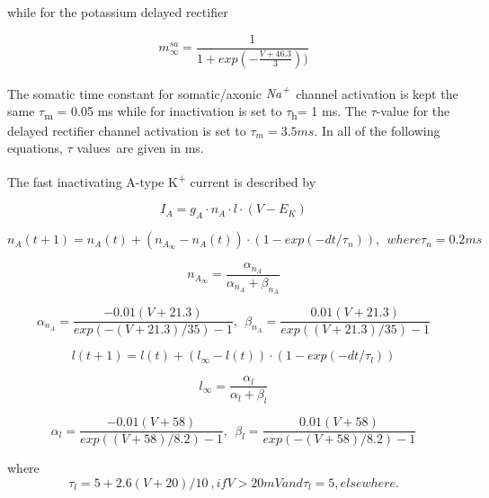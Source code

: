 \documentclass[12pt]{article}
\begin{document}
while for the potassium delayed rectifier

\begin{equation}
m_{\infty}^{sa}=\frac {1}{1+exp(-\frac{V+46.3}{3}))}
\end{equation}

The somatic time constant for somatic/axonic \textit{Na}\textit{\textsuperscript{+}}~channel activation is kept the
same $\tau$\textsubscript{m} = 0.05 ms while for inactivation is set to $\tau$\textsubscript{h}= 1 ms. The $\tau$-value for the delayed rectifier channel activation is set to $\tau_{m}= 3.5 ms$. In all of the
following equations, $\tau$ values~are given in ms.



The fast inactivating A-type K\textsuperscript{+ }current is described by


\begin{equation}
I_A = g_A \cdot n_A \cdot l \cdot (V-E_K)
\end{equation}

\begin{equation}
n_A(t+1)=n_A(t)+(n_{A_{\infty }}-n_A(t))\cdot (1-exp(-dt/\tau_n)),\ \ where 
\tau_n=0.2 ms
\end{equation}

\begin{equation}
n_{A_{\infty }}=\frac{\alpha_{n_A}}{\alpha_{n_A}+\beta_{n_A}}
\end{equation}

\begin{equation}
\alpha_{n_A}=\frac{-0.01(V+21.3)}{exp(-(V+21.3)/35)-1} ,\ \  \beta_{n_A}=\frac{0.01(V+21.3)}{exp( (V+21.3)/35)-1}
\end{equation}

\begin{equation}
l(t+1)=l(t)+(l_{\infty }-l(t))\cdot (1-exp(-dt/\tau_l))
\end{equation}


\begin{equation}
l_{\infty }=\frac{\alpha_l}{\alpha_l+\beta_l}
\end{equation}

\begin{equation}
\alpha_l=\frac{-0.01(V+58)}{exp( (V+58)/8.2)-1} ,\ \  \beta_l=\frac{0.01(V+58)}{exp(-(V+58)/8.2)-1}
\end{equation}

where
\begin{equation}
\tau_l=5+2.6(V+20)/10\ , if V > 20 mV and  \tau_l=5, elsewhere.
\end{equation}
\end{document}
